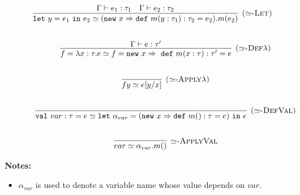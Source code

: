 \documentclass{llncs}
\newcommand{\keywadj}[1]{\mathtt{#1}}
\newcommand{\keyw}[1]{\keywadj{#1}~}
\begin{document}
\[
\begin{array}{c}
	
\infer[\textsc{($\simeq$-Let)}]
	{\keyw{let} y = e_1~\keyw{in} e_2 \simeq (\keyw{new} x \Rightarrow \keyw{def} m(y: \tau_1) : \tau_2 = e_2).m(e_2)}
	{\Gamma \vdash e_1 : \tau_1 & \Gamma \vdash e_2 : \tau_2}  \\[5ex]
~~~~~~~~~~
\infer[\textsc{($\simeq$-Def$\lambda$)}]
	{f = \lambda x : \tau . e \simeq f = \keyw{new} x \Rightarrow~\keyw{def} m(x : \tau) : \tau' = e}
	{\Gamma \vdash e : \tau'}\\[5ex]
~~~~~~~~~~
\infer[\textsc{($\simeq$-Apply$\lambda$)}] 
	{f y \simeq e[y/x] }
	{} \\[5ex]
~~~~~~~~~~

\infer[\textsc{($\simeq$-DefVal)}]
	{\keyw{val} var : \tau = e \simeq \keyw{let} \alpha_{var} = (\keyw{new} x \Rightarrow \keyw{def} m() : \tau = e)~\keyw{in} e}
	{} \\[5ex]
~~~~~~~~~~
\infer[\textsc{$\simeq$-ApplyVal}]
	{var \simeq \alpha_{var}.m()}
	{}
  
\end{array}
\]	

\noindent \textbf{Notes:}
\begin{itemize}
	\item $\alpha_{var}$ is used to denote a variable name whose value depends on $var$.
\end{itemize}
\end{document}
